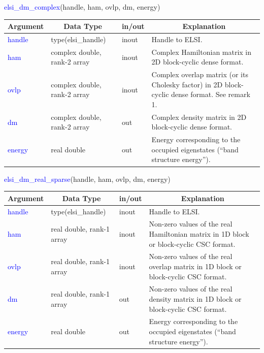 \documentclass{report}
\begin{document}
\bigskip
\begin{labeling}{\hspace{6cm}}
\item [\hspace{0.3cm} \textcolor{blue}{elsi\_dm\_complex}(handle, ham, ovlp, dm, energy)]
\end{labeling}

\begin{tabular}[]{|p{20mm}|p{45mm}|p{15mm}|p{85mm}|}
\hline
\multicolumn{1}{|c|}{\textbf{Argument}} & \multicolumn{1}{c|}{\textbf{Data Type}} & \multicolumn{1}{c|}{\textbf{in/out}} & \multicolumn{1}{c|}{\textbf{Explanation}}\\
\hline
\textcolor{blue}{handle} & type(elsi\_handle)           & inout & Handle to ELSI.\\
\hline
\textcolor{blue}{ham}    & complex double, rank-2 array & inout & Complex Hamiltonian matrix in 2D block-cyclic dense format.\\
\hline
\textcolor{blue}{ovlp}   & complex double, rank-2 array & inout & Complex overlap matrix (or its Cholesky factor) in 2D block-cyclic dense format.  See remark 1.\\
\hline
\textcolor{blue}{dm}     & complex double, rank-2 array & out   & Complex density matrix in 2D block-cyclic dense format.\\
\hline
\textcolor{blue}{energy} & real double                  & out   & Energy corresponding to the occupied eigenstates (``band structure energy'').\\
\hline
\end{tabular}

\newpage
\begin{labeling}{\hspace{6cm}}
\item [\hspace{0.3cm} \textcolor{blue}{elsi\_dm\_real\_sparse}(handle, ham, ovlp, dm, energy)]
\end{labeling}

\begin{tabular}[]{|p{20mm}|p{45mm}|p{15mm}|p{85mm}|}
\hline
\multicolumn{1}{|c|}{\textbf{Argument}} & \multicolumn{1}{c|}{\textbf{Data Type}} & \multicolumn{1}{c|}{\textbf{in/out}} & \multicolumn{1}{c|}{\textbf{Explanation}}\\
\hline
\textcolor{blue}{handle} & type(elsi\_handle)        & inout & Handle to ELSI.\\
\hline
\textcolor{blue}{ham}    & real double, rank-1 array & inout & Non-zero values of the real Hamiltonian matrix in 1D block or block-cyclic CSC format.\\
\hline
\textcolor{blue}{ovlp}   & real double, rank-1 array & inout & Non-zero values of the real overlap matrix in 1D block or block-cyclic CSC format.\\
\hline
\textcolor{blue}{dm}     & real double, rank-1 array & out   & Non-zero values of the real density matrix in 1D block or block-cyclic CSC format.\\
\hline
\textcolor{blue}{energy} & real double               & out   & Energy corresponding to the occupied eigenstates (``band structure energy'').\\
\hline
\end{tabular}
\end{document}
